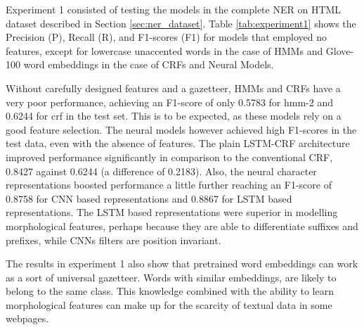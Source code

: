 \documentclass[sigconf]{acmart}
\begin{document}
Experiment 1 consisted of testing the models in the complete NER on HTML dataset 
described in Section \ref{sec:ner_dataset}. Table \ref{tab:experiment1} shows the 
Precision (P), Recall (R), and F1-scores (F1) for models that employed no features, 
except for lowercase unaccented words
in the case of HMMs and Glove-100 word embeddings in the case of CRFs and Neural Models.

Without carefully designed features and a gazetteer, HMMs and CRFs have a very 
poor performance, achieving an F1-score of only 0.5783 for hmm-2 and 0.6244 for crf
in the test set. This is to be expected, as these models rely on a good feature selection.
The neural models however achieved high F1-scores in the test
data, even with the absence of features. The plain LSTM-CRF architecture improved performance 
significantly in comparison to the conventional CRF, 0.8427 against 0.6244 (a difference 
of 0.2183). Also, the neural character representations boosted performance a little further
reaching an F1-score of 0.8758 for CNN based representations and 0.8867 for LSTM based
representations. The LSTM based representations were superior in modelling
morphological features, perhaps because they are able to differentiate suffixes and prefixes, 
while CNNs filters are position invariant. 

The results in experiment 1 also show that pretrained word embeddings can work as a sort of
universal gazetteer. Words with similar embeddings, are likely to belong to the same class.
This knowledge combined with the ability to learn morphological features can make up for 
the scarcity of textual data in some webpages.
\end{document}
